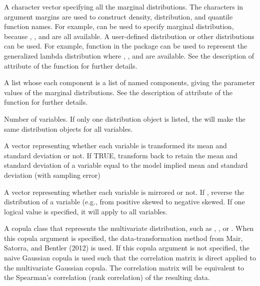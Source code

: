 \documentclass[a4paper]{book}
\begin{document}
\begin{Arguments}
\begin{ldescription}
\item[\code{margins}] 
A character vector specifying all the marginal distributions. The characters in argument margins are used to construct density, distribution, and quantile function names. For example,  can be used to specify marginal distribution, because , , and  are all available. A user-defined distribution or other distributions can be used. For example,  function in the  package can be used to represent the generalized lambda distribution where , , and  are available. See the description of  attribute of the  function for further details.

\item[\code{...}] 
A list whose each component is a list of named components, giving the parameter values of the marginal distributions. See the description of  attribute of the  function for further details.

\item[\code{p}] 
Number of variables. If only one distribution object is listed, the  will make the same distribution objects for all variables.

\item[\code{keepScale}] 
A vector representing whether each variable is transformed its mean and standard deviation or not. If TRUE, transform back to retain the mean and standard deviation of a variable equal to the model implied mean and standard deviation (with sampling error)

\item[\code{reverse}] 
A vector representing whether each variable is mirrored or not. If , reverse the distribution of a variable (e.g., from positive skewed to negative skewed. If one logical value is specified, it will apply to all variables.

\item[\code{copula}] 
A copula class that represents the multivariate distribution, such as , , or . When this copula argument is specified, the data-transformation method from Mair, Satorra, and Bentler (2012) is used. If this copula argument is not specified, the naive Gaussian copula is used such that the correlation matrix is direct applied to the multivariate Gaussian copula. The correlation matrix will be equivalent to the Spearman's correlation (rank correlation) of the resulting data. 


\end{ldescription}
\end{Arguments}
\end{document}
